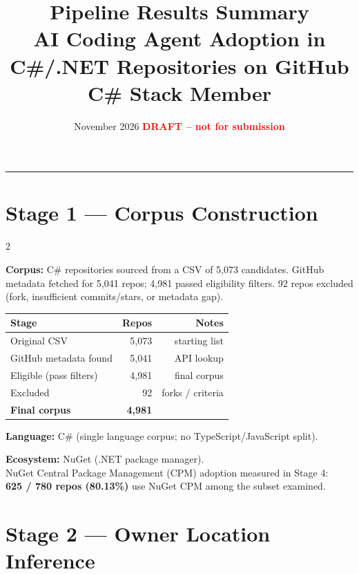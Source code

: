 \documentclass[10pt,a4paper]{article}
\title{\textbf{Pipeline Results Summary}\\
\large AI Coding Agent Adoption in C\#/.NET Repositories on GitHub\\[2pt]
\normalsize C\# Stack Member}
\date{November 2026 \quad \textcolor{red}{\textbf{DRAFT -- not for submission}}}
\begin{document}
\maketitle
\vspace{-4pt}
\hrule
\vspace{8pt}

\section*{Stage 1 --- Corpus Construction}

\begin{multicols}{2}

\textbf{Corpus:} C\# repositories sourced from a CSV of 5,073 candidates.
GitHub metadata fetched for 5,041 repos; 4,981 passed eligibility filters.
92 repos excluded (fork, insufficient commits/stars, or metadata gap).

\begin{tabular}{@{}lrr@{}}
\toprule
Stage & Repos & Notes \\
\midrule
Original CSV            & 5,073 & starting list \\
GitHub metadata found   & 5,041 & API lookup \\
Eligible (pass filters) & 4,981 & final corpus \\
Excluded                &    92 & forks / criteria \\
\midrule
\textbf{Final corpus} & \textbf{4,981} & \\
\bottomrule
\end{tabular}

\columnbreak

\textbf{Language:} C\# (single language corpus; no TypeScript/JavaScript split).

\vspace{6pt}
\textbf{Ecosystem:} NuGet (.NET package manager). \\
NuGet Central Package Management (CPM) adoption measured in Stage 4:\\
\textbf{625 / 780 repos (80.13\%)} use NuGet CPM among the subset examined.

\vspace{6pt}
\section*{Stage 2 --- Owner Location Inference}


\end{multicols}
\end{document}
